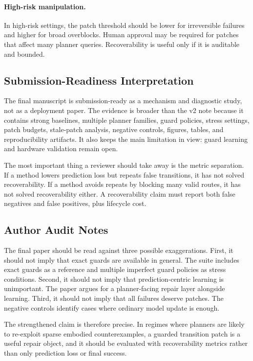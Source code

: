 \documentclass{article}
\begin{document}
\paragraph{High-risk manipulation.}
In high-risk settings, the patch threshold should be lower for irreversible
failures and higher for broad overblocks. Human approval may be required for
patches that affect many planner queries. Recoverability is useful only if it
is auditable and bounded.

\subsection{Submission-Readiness Interpretation}

The final manuscript is submission-ready as a mechanism and diagnostic study,
not as a deployment paper. The evidence is broader than the v2 note because it
contains strong baselines, multiple planner families, guard policies, stress
settings, patch budgets, stale-patch analysis, negative controls, figures,
tables, and reproducibility artifacts. It also keeps the main limitation in
view: guard learning and hardware validation remain open.

The most important thing a reviewer should take away is the metric separation.
If a method lowers prediction loss but repeats false transitions, it has not
solved recoverability. If a method avoids repeats by blocking many valid
routes, it has not solved recoverability either. A recoverability claim must
report both false negatives and false positives, plus lifecycle cost.

\subsection{Author Audit Notes}

The final paper should be read against three possible exaggerations. First, it
should not imply that exact guards are available in general. The suite includes
exact guards as a reference and multiple imperfect guard policies as stress
conditions. Second, it should not imply that prediction-centric learning is
unimportant. The paper argues for a planner-facing repair layer alongside
learning. Third, it should not imply that all failures deserve patches. The
negative controls identify cases where ordinary model update is enough.

The strengthened claim is therefore precise. In regimes where planners are
likely to re-exploit sparse embodied counterexamples, a guarded transition
patch is a useful repair object, and it should be evaluated with recoverability
metrics rather than only prediction loss or final success.
\end{document}
